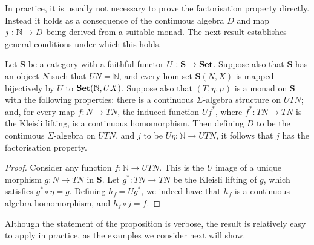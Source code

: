 In practice, it is usually not necessary to prove the factorisation property directly. Instead  it holds as a consequence of the continuous algebra $D$ and map $j: \mathbb{N} \to D$ being derived from a suitable monad. The next result establishes general conditions under which this holds.
\begin{proposition}
\label{proposition:monad}
Let $\mathbf{S}$ be a category with a faithful functor $U : \mathbf{S} \to \mathbf{Set}$. Suppose also that 
$\mathbf{S}$ has an object $N$ such that $UN = \mathbb{N}$, and every hom set $\mathbf{S}(N,X)$
is mapped bijectively by $U$ to $\mathbf{Set}(\mathbb{N},UX)$. Suppose also that $(T,\eta,\mu)$ is a monad on $\mathbf{S}$
with the following properties: there is a continuous $\Sigma$-algebra structure on $UTN$; and, for 
every map $f \colon N \to TN$, the induced function $Uf^*$, where 
$f^* \colon TN \to TN$ is the Kleisli lifting, is a continuous  homomorphism.
Then defining $D$ to be the continuous $\Sigma$-algebra on $U T N$, and
$j$ to be $U\eta \colon \mathbb{N} \to UTN$, it follows that $j$ has the factorisation property.
\end{proposition}

\begin{proof}
Consider any function $f \colon \mathbb{N} \to UTN$. This is the $U$ image of a unique morphism 
$g : N \to TN$ in $\mathbf{S}$. Let $g^*: TN \to TN$ be the Kleisli lifting of $g$, which satisfies $g^* \circ \eta = g$. Defining $h_f = Ug^*$, we indeed have  that $h_f$ is a continuous algebra homomorphism, and
$h_f \circ j = f$.
\end{proof}


\noindent
Although the statement of the proposition is verbose, the result is relatively easy to apply in practice, as the examples we consider next will show.

%
%

